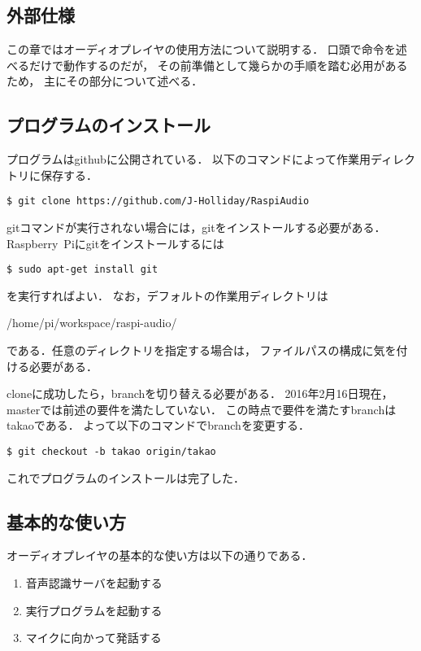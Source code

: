 \documentclass{jsarticle}
\begin{document}
\begin{multicols}{2}
\section{外部仕様}
\label{sec:外部仕様}
\label{外部仕様}

この章ではオーディオプレイヤの使用方法について説明する．
口頭で命令を述べるだけで動作するのだが，
その前準備として幾らかの手順を踏む必用があるため，
主にその部分について述べる．

\subsection{プログラムのインストール}

プログラムはgithubに公開されている．
以下のコマンドによって作業用ディレクトリに保存する．
\begin{lstlisting}[caption=/bin/sh]
$ git clone https://github.com/J-Holliday/RaspiAudio
\end{lstlisting}
gitコマンドが実行されない場合には，gitをインストールする必要がある．
Raspberry\ Piにgitをインストールするには
\begin{lstlisting}[caption=/bin/sh]
$ sudo apt-get install git
\end{lstlisting}
を実行すればよい．
なお，デフォルトの作業用ディレクトリは
\begin{center}
/home/pi/workspace/raspi-audio/
\end{center}
である．任意のディレクトリを指定する場合は，
ファイルパスの構成に気を付ける必要がある．

cloneに成功したら，branchを切り替える必要がある．
2016年2月16日現在，masterでは前述の要件を満たしていない．
この時点で要件を満たすbranchはtakaoである．
よって以下のコマンドでbranchを変更する．
\begin{lstlisting}[caption=/bin/sh]
$ git checkout -b takao origin/takao
\end{lstlisting}
これでプログラムのインストールは完了した．

\subsection{基本的な使い方}

オーディオプレイヤの基本的な使い方は以下の通りである．
\begin{enumerate}
\item 音声認識サーバを起動する
\item 実行プログラムを起動する
\item マイクに向かって発話する
\end{enumerate}


\end{multicols}
\end{document}
